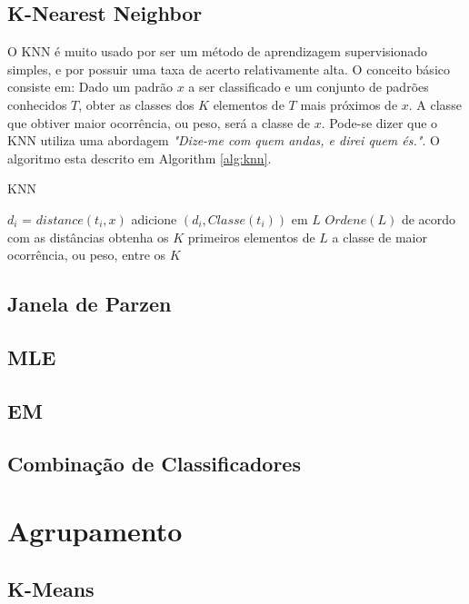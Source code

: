 \subsection{K-Nearest Neighbor}
\label{subsec:knn}

O KNN é muito usado por ser um método de aprendizagem supervisionado simples, e por possuir uma taxa de acerto relativamente alta. O conceito básico consiste em: Dado um padrão $x$ a ser classificado e um conjunto de padrões conhecidos $T$, obter as classes dos $K$ elementos de $T$ mais próximos de $x$. A classe que obtiver maior ocorrência, ou peso, será a classe de $x$. Pode-se dizer que o KNN utiliza uma abordagem \textit{"Dize-me com quem andas, e direi quem és."}. O algoritmo esta descrito em Algorithm \ref{alg:knn}.

\begin{algorithm}[H]
\caption{KNN}
\label{alg:knn}
\begin{algorithmic}[1]
\STATE  $d_i$ = $distance(t_i, x)$
\STATE  adicione $(d_i, Classe(t_i))$ em $L$
\ENDFOR
\STATE $Ordene(L)$ de acordo com as distâncias
\STATE obtenha os $K$ primeiros elementos de $L$
\RETURN a classe de maior ocorrência, ou peso, entre os $K$
\end{algorithmic}
\end{algorithm}


\subsection{Janela de Parzen}
\subsection{MLE}
\subsection{EM}
\subsection{Combinação de Classificadores}

\section{Agrupamento}
\subsection{K-Means}



